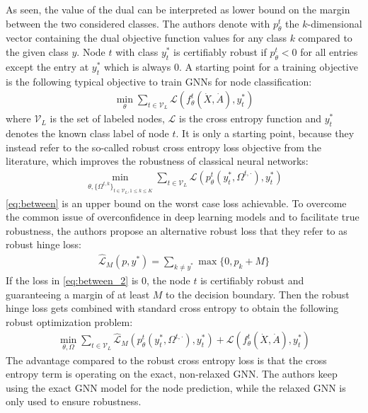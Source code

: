 \documentclass[a4paper,preprint]{sig-alternate}
\begin{document}
As seen, the value of the dual can be interpreted as lower bound on the margin between the two considered classes.
The authors denote with $p_{\theta}^t$ the $k$-dimensional vector containing the dual objective function values
for any class $k$ compared to the given class $y$. Node $t$ with class $y_t^{\ast}$ is certifiably robust if $p_{\theta}^t < 0$ for all entries
except the entry at $y_t^{\ast}$ which is always $0$. A starting point for a training objective is the following typical objective 
to train GNNs for node classification:
\begin{gather}
    \min_{\theta} \sum_{t \in \mathcal{V}_L} \mathcal{L} (f_{\theta}^t (\dot{X}, \dot{A}), y_t^{\ast})
\end{gather}
where $\mathcal{V}_L$ is the set of labeled nodes, $\mathcal{L}$ is the
cross entropy function and $y_t^{\ast}$ denotes the known class label of node $t$.
It is only a starting point, because they instead refer to the so-called robust cross entropy loss objective from the literature,
which improves the robustness of classical neural networks:
\begin{gather}
\label{eq:between}
    \min_{\theta, \{\Omega^{t, k}\}_{t \in \mathcal{V}_L, 1 \leq k \leq K}} \sum_{t \in \mathcal{V}_L} \mathcal{L} (p_{\theta}^t (y_t^{\ast}, \Omega^{t, \cdot}), y_t^{\ast})
\end{gather}
\ref{eq:between} is an upper bound on the worst case loss achievable. To overcome the common issue of overconfidence in deep learning 
models and to facilitate true robustness, the authors propose an alternative robust loss that they refer to as robust hinge loss:
\begin{gather}
\label{eq:between_2}
    \mathcal{\hat{L}}_M (p, y^{\ast}) = \sum_{k \neq y^{\ast}} \max \{0, p_k + M\}
\end{gather}
If the loss in \ref{eq:between_2} is $0$, the node $t$ is certifiably robust and guaranteeing a margin of at least $M$ to the decision boundary.
Then the robust hinge loss gets combined with standard cross entropy to obtain the following robust optimization problem:
\begin{gather}
\label{eq:2}
    \min_{\theta, \Omega} \sum_{t \in \mathcal{V}_L} \mathcal{\hat{L}}_M (p_{\theta}^t (y_t^{\ast}, \Omega^{t, \cdot}), y_t^{\ast}) + \mathcal{L} (f_{\theta}^t (\dot{X}, \dot{A}), y_t^{\ast})
\end{gather}
The advantage compared to the robust cross entropy loss is that the cross entropy term is operating on the exact, non-relaxed GNN.
The authors keep using the exact GNN model for the node prediction, while the relaxed GNN is only used to ensure robustness. 
\end{document}
